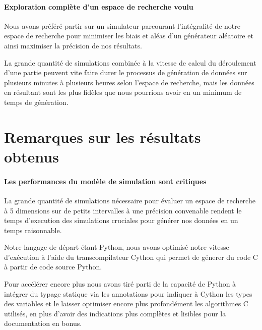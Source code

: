 		\paragraph{Exploration complète d'un espace de recherche voulu}
		
		\begin{result}
			Nous avons préféré partir sur un simulateur parcourant l'intégralité de notre espace de recherche pour minimiser les biais et aléas d'un générateur aléatoire et ainsi maximiser la précision de nos résultats.
		\end{result}
		
		La grande quantité de simulations combinée à la vitesse de calcul du déroulement d'une partie peuvent vite faire durer le processus de génération de données sur plusieurs minutes à plusieurs heures selon l'espace de recherche, mais les données en résultant sont les plus fidèles que nous pourrions avoir en un minimum de temps de génération. 
	
		
	\section{Remarques sur les résultats obtenus}
	
		\paragraph{Les performances du modèle de simulation sont critiques}
		La grande quantité de simulations nécessaire pour évaluer un espace de recherche à 5 dimensions sur de petits intervalles à une précision convenable rendent le temps d'execution des simulations cruciales pour générer nos données en un temps raisonnable.
		
		
		Notre langage de départ étant Python, nous avons optimisé notre vitesse d'exécution à l'aide du transcompilateur Cython qui permet de génerer du code C à partir de code source Python.
		
		Pour accélérer encore plus nous avons tiré parti de la capacité de Python à intégrer du typage statique via les annotations pour indiquer à Cython les types des variables et le laisser optimiser encore plus profondément les algorithmes C utilisés, en plus d'avoir des indications plus complètes et lisibles pour la documentation en bonus.
		
		
		
